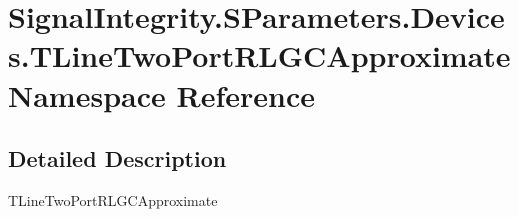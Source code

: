 \hypertarget{namespaceSignalIntegrity_1_1SParameters_1_1Devices_1_1TLineTwoPortRLGCApproximate}{}\section{Signal\+Integrity.\+S\+Parameters.\+Devices.\+T\+Line\+Two\+Port\+R\+L\+G\+C\+Approximate Namespace Reference}
\label{namespaceSignalIntegrity_1_1SParameters_1_1Devices_1_1TLineTwoPortRLGCApproximate}


\subsection{Detailed Description}
\begin{DoxyVerb}TLineTwoPortRLGCApproximate\end{DoxyVerb}
 